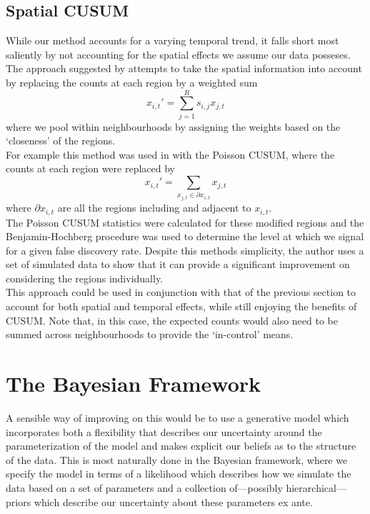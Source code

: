\documentclass[11pt]{report}
\begin{document}
\section{Spatial CUSUM}

While our method accounts for a varying temporal trend, it falls short most saliently by not accounting for the spatial effects we assume our data posseses. The approach suggested by \citet{raubertas} attempts to take the spatial information into account by replacing the counts at each region by a weighted sum
\begin{equation*}
x_{i,t}' = \sum_{j=1}^R s_{i, j} x_{j, t}
\end{equation*} 
where we pool within neighbourhoods by assigning the weights based on the `closeness' of the regions. \\

For example this method was used in \citet{spatialcusum} with the Poisson CUSUM, where the counts at each region were replaced by
\begin{equation*}
x_{i,t}' = \sum_{x_{j, t} \in \partial x_{i,t}} x_{j, t} 
\end{equation*} 
where $\partial x_{i,t}$ are all the regions including and adjacent to $x_{i,t}$. \\

The Poisson CUSUM statistics were calculated for these modified regions and the Benjamin-Hochberg procedure was used to determine the level at which we signal for a given false discovery rate. Despite this methods simplicity, the author uses a set of simulated data to show that it can provide a significant improvement on considering the regions individually. \\ 

This approach could be used in conjunction with that of the previous section to account for both spatial and temporal effects, while still enjoying the benefits of CUSUM. Note that, in this case, the expected counts would also need to be summed across neighbourhoods to provide the `in-control' means. 

\chapter{The Bayesian Framework}

A sensible way of improving on this would be to use a generative model which incorporates both a flexibility that describes our uncertainty around the parameterization of the model and makes explicit our beliefs as to the structure of the data. This is most naturally done in the Bayesian framework, where we specify the model in terms of a likelihood which describes how we simulate the data based on a set of parameters and a collection of---possibly hierarchical---priors which describe our uncertainty about these parameters ex ante. \\
\end{document}
